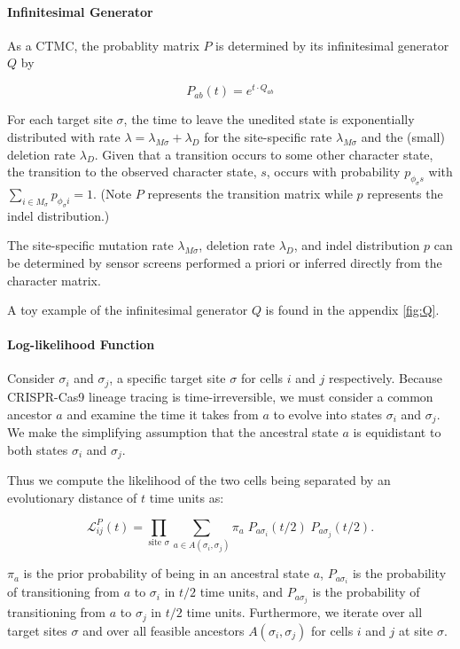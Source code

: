 \documentclass{article}
\begin{document}
\paragraph*{Infinitesimal Generator} As a CTMC, the probablity matrix $P$ is determined by its infinitesimal generator $Q$ by

\begin{equation}
  P_{ab}(t) = e^{t \cdot Q_{ab}}
\end{equation}

For each target site $\sigma$, the time to leave the unedited state is exponentially distributed with rate $\lambda=\lambda_{M \sigma} + \lambda_D$ for the site-specific rate $\lambda_{M \sigma}$ and the (small) deletion rate $\lambda_D$. Given that a transition occurs to some other character state, the transition to the observed character state, $s$, occurs with probability $p_{\phi_\sigma s}$ with $\sum_{i \in M_\sigma} p_{\phi_\sigma i} = 1$. (Note $P$ represents the transition matrix while $p$ represents the indel distribution.)

The site-specific mutation rate $\lambda_{M \sigma}$, deletion rate $\lambda_D$, and indel distribution $p$ can be determined by sensor screens performed a priori or inferred directly from the character matrix.

A toy example of the infinitesimal generator $Q$ is found in the appendix \ref{fig:Q}.

\paragraph*{Log-likelihood Function} Consider $\sigma_i$ and $\sigma_j$, a specific target site $\sigma$ for cells $i$ and $j$ respectively. Because CRISPR-Cas9 lineage tracing is time-irreversible, we must consider a common ancestor $a$ and examine the time it takes from $a$ to evolve into states $\sigma_i$ and $\sigma_j$. We make the simplifying assumption that the ancestral state $a$ is equidistant to both states $\sigma_i$ and $\sigma_j$. 

Thus we compute the likelihood of the two cells being separated by an evolutionary distance of $t$ time units as:

\begin{equation}
  \mathcal{L}_{ij}^P (t) = \prod_{\textrm{site } \sigma} \sum_{a \in A(\sigma_i, \sigma_j)} \pi_a \; P_{a \sigma_i}(t/2) \; P_{a \sigma_j}(t/2).
\end{equation}

$\pi_a$ is the prior probability of being in an ancestral state $a$, $P_{a \sigma_i}$ is the probability of transitioning from $a$ to $\sigma_i$ in $t/2$ time units, and $P_{a \sigma_j}$ is the probability of transitioning from $a$ to $\sigma_j$ in $t/2$ time units. Furthermore, we iterate over all target sites $\sigma$ and over all feasible ancestors $A(\sigma_i, \sigma_j)$ for cells $i$ and $j$ at site $\sigma$.
\end{document}
